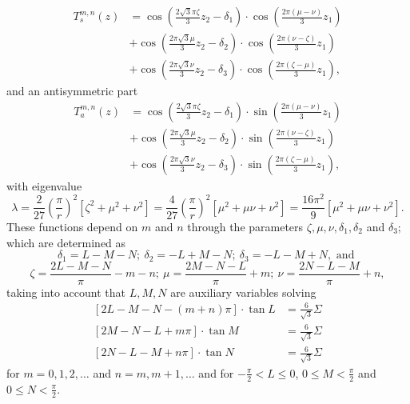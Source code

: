 \documentclass{amsart}
\theoremstyle{definition}
\theoremstyle{remark}
\renewcommand\leq\leqslant
\numberwithin{equation}{section}
\theoremstyle{definition}
\theoremstyle{remark}
\begin{document}
\begin{equation}
	\begin{aligned}
		T_s^{m,n}(z) & =\cos \left(\frac{2\sqrt{3}\pi \zeta}{3}z_2-\delta_1\right) \cdot \cos \left(\frac{2\pi(\mu-\nu)}{3}z_1\right) \\
		& +\cos \left(\frac{2\pi\sqrt{3} \mu}{3 }z_2-\delta_2\right) \cdot \cos \left(\frac{2\pi(\nu-\zeta)}{3}z_1\right) \\
		& +\cos \left(\frac{2\pi\sqrt{3} \nu}{3}z_2-\delta_3\right) \cdot \cos \left(\frac{2\pi(\zeta-\mu)}{3}z_1\right),
	\end{aligned}
\end{equation} and an antisymmetric part \begin{equation}
	\begin{aligned}
		T_a^{m,n}(z) & =\cos \left(\frac{2\sqrt{3}\pi \zeta}{3}z_2-\delta_1\right) \cdot \sin \left(\frac{2\pi(\mu-\nu)}{3}z_1\right) \\
		& +\cos \left(\frac{2\pi\sqrt{3} \mu}{3 }z_2-\delta_2\right) \cdot \sin \left(\frac{2\pi(\nu-\zeta)}{3}z_1\right) \\
		& +\cos \left(\frac{2\pi\sqrt{3} \nu}{3}z_2-\delta_3\right) \cdot \sin \left(\frac{2\pi(\zeta-\mu)}{3}z_1\right),
	\end{aligned}
\end{equation}
with eigenvalue
\begin{equation}
	\lambda=\frac{2}{27}\left(\frac{\pi}{r}\right)^2\left[\zeta^2+\mu^2+\nu^2\right]=\frac{4}{27}\left(\frac{\pi}{r}\right)^2\left[\mu^2+\mu \nu+\nu^2\right]=\frac{16\pi^2}{9}\left[\mu^2+\mu \nu+\nu^2\right] .
\end{equation}
These functions depend on $m$ and $n$ through the parameters $\zeta,\mu,\nu,\delta_1,\delta_2$ and $\delta_3$; which are determined as
\begin{equation}
	\delta_1=L-M-N ;\ \delta_2=-L+M-N ;\ \delta_3=-L-M+N,\text{ and }
\end{equation}
\begin{equation}
	\zeta=\frac{2 L-M-N}{\pi}-m-n ;\ \mu=\frac{2 M-N-L}{\pi}+m ;\ \nu=\frac{2 N-L-M}{\pi}+n,
\end{equation}
taking into account that $L,M,N$ are auxiliary variables solving\begin{equation}
	\begin{aligned}
		{[2 L-M-N-(m+n) \pi] \cdot \tan L } & =\frac{6}{\sqrt{3}} \Sigma  \\
		{[2 M-N-L+m \pi] \cdot \tan M } & =\frac{6}{\sqrt{3}} \Sigma  \\
		{[2 N-L-M+n \pi] \cdot \tan N } & =\frac{6}{\sqrt{3}} \Sigma 
	\end{aligned}
\end{equation}
for $m=0,1,2,\ldots$ and $n=m,m+1,\ldots$ and for $-\frac{\pi}{2}<L\leq 0$, $0\leq M<\frac{\pi}{2}$ and $0\leq N<\frac{\pi}{2}$.
\end{document}

